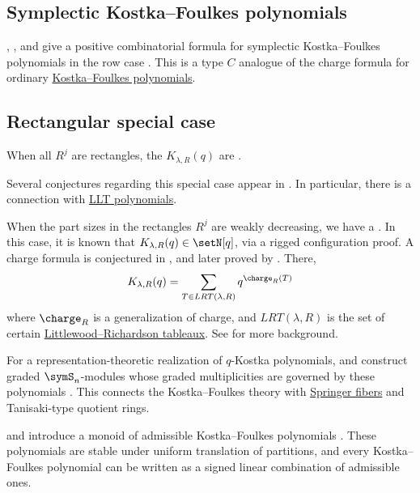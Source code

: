\subsection[symplecticKostkaFoulkes]{Symplectic Kostka--Foulkes polynomials}

, , and
 give a positive combinatorial formula for symplectic
Kostka--Foulkes polynomials in the row case \cite{DolegaGerberTorres2020}.
This is a type $C$ analogue of the charge formula for ordinary
\hyperref[kostkaFoulkes]{Kostka--Foulkes polynomials}.


\subsection[kostkaFoulkesRect]{Rectangular special case}

When all $R^j$ are rectangles, the $K_{\lambda,R}(q)$ are
\label{poincarePolynomial}.

Several conjectures regarding this special case appear in
\cite{Shimozono2005GeneralizedKostka}.
In particular, there is a connection with \hyperref[LLT]{LLT polynomials}.

When the part sizes in the rectangles $R^j$ are weakly decreasing, we have a
\label{dominantSequenceOfRectangles}.
In this case, it is known that $K_{\lambda,R}(q) \in \setN[q]$, via a rigged configuration proof.
A charge formula is conjectured in \cite[Conj.~27]{ShimozonoWeyman2000},
and later proved by  \cite[Thm.~11]{Shimozono2001}.
There,
\[
K_{\lambda,R}(q) = \sum_{T \in LRT(\lambda,R)} q^{\charge_R(T)}
\]
where $\charge_R$ is a generalization of charge, and $LRT(\lambda,R)$ is the
set of certain \hyperref[lrTableaux]{Littlewood--Richardson tableaux}.
See \cite{KirillovShimozono2002,KirillovSchillingShimozono2001,SchillingWarnaar1999}
for more background.
 
For a representation-theoretic realization of $q$-Kostka polynomials,
 and  construct graded
$\symS_n$-modules whose graded multiplicities are governed by these
polynomials \cite{GarsiaProcesi1992}.  This connects the Kostka--Foulkes
theory with \hyperref[springerFibers]{Springer fibers} and Tanisaki-type
quotient rings.

 and  introduce a monoid of
admissible Kostka--Foulkes polynomials \cite{PetrulloSenato2020}.  These
polynomials are stable under uniform translation of partitions, and every
Kostka--Foulkes polynomial can be written as a signed linear combination of
admissible ones.

